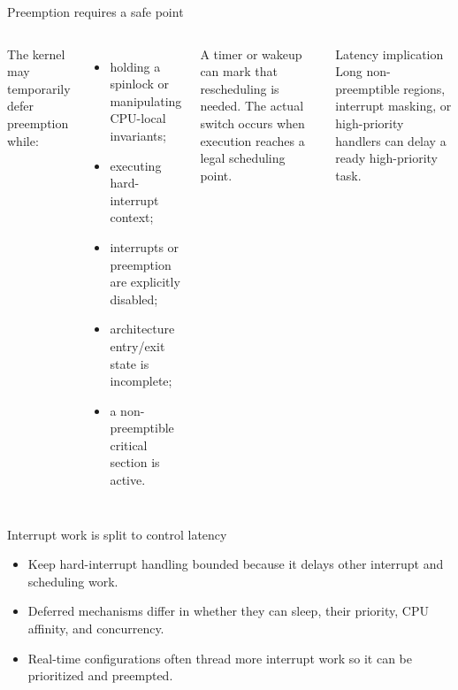 \documentclass[aspectratio=169,11pt]{beamer}
\begin{document}
\begin{frame}{Preemption requires a safe point}
  \begin{columns}[T,onlytextwidth]
      The kernel may temporarily defer preemption while:
      \begin{itemize}
        \item holding a spinlock or manipulating CPU-local invariants;
        \item executing hard-interrupt context;
        \item interrupts or preemption are explicitly disabled;
        \item architecture entry/exit state is incomplete;
        \item a non-preemptible critical section is active.
      \end{itemize}
      \begin{tcolorbox}[title=Reschedule request]
        A timer or wakeup can mark that rescheduling is needed. The actual switch occurs when execution reaches a legal scheduling point.
      \end{tcolorbox}
      \begin{alertblock}{Latency implication}
        Long non-preemptible regions, interrupt masking, or high-priority handlers can delay a ready high-priority task.
      \end{alertblock}
  \end{columns}
\end{frame}

\begin{frame}{Interrupt work is split to control latency}
  \centering
  \begin{itemize}
    \item Keep hard-interrupt handling bounded because it delays other interrupt and scheduling work.
    \item Deferred mechanisms differ in whether they can sleep, their priority, CPU affinity, and concurrency.
    \item Real-time configurations often thread more interrupt work so it can be prioritized and preempted.
  \end{itemize}
\end{frame}
\end{document}
